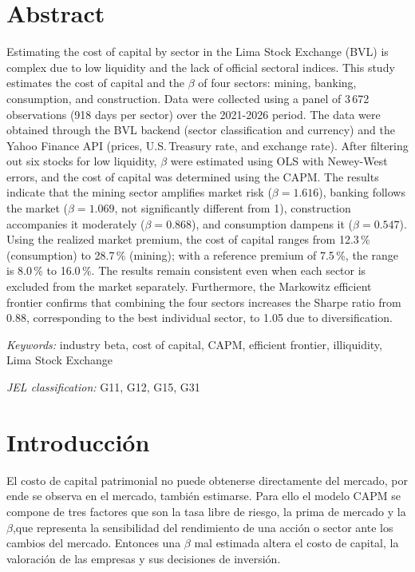 \documentclass[12pt]{article}
\begin{document}
\section{Abstract}
\noindent Estimating the cost of capital by sector in the Lima Stock Exchange (BVL) is complex due to low liquidity and the lack of official sectoral indices. This study estimates the cost of capital and the $\beta$ of four sectors: mining, banking, consumption, and construction. Data were collected using a panel of 3\,672 observations (918 days per sector) over the 2021-2026 period. The data were obtained through the BVL backend (sector classification and currency) and the Yahoo Finance API (prices, U.S.\,Treasury rate, and exchange rate). After filtering out six stocks for low liquidity, $\beta$ were estimated using OLS with Newey-West errors, and the cost of capital was determined using the CAPM. The results indicate that the mining sector amplifies market risk ($\beta=1.616$), banking follows the market ($\beta=1.069$, not significantly different from 1), construction accompanies it moderately ($\beta=0.868$), and consumption dampens it ($\beta=0.547$). Using the realized market premium, the cost of capital ranges from 12.3\,\% (consumption) to 28.7\,\% (mining); with a reference premium of 7.5\,\%, the range is 8.0\,\% to 16.0\,\%. The results remain consistent even when each sector is excluded from the market separately. Furthermore, the Markowitz efficient frontier confirms that combining the four sectors increases the Sharpe ratio from 0.88, corresponding to the best individual sector, to 1.05 due to diversification.

\vspace{6pt}
\noindent\textit{Keywords:} industry beta, cost of capital, CAPM, efficient frontier, illiquidity, Lima Stock Exchange

\noindent\textit{JEL classification:} G11, G12, G15, G31

\newpage
\section{Introducción}
El costo de capital patrimonial no puede obtenerse directamente del mercado, por ende se  observa en el mercado, también estimarse. Para ello el modelo CAPM se compone de tres factores que son la tasa libre de riesgo, la prima de mercado y la $\beta$,que representa la sensibilidad del rendimiento de una acción o sector ante los cambios del mercado. Entonces una $\beta$ mal estimada altera el costo de capital, la valoración de las empresas y sus decisiones de inversión.
\end{document}
